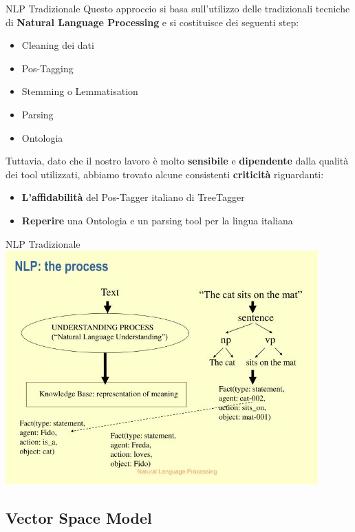 \documentclass[british]{beamer}
\begin{document}
\begin{frame}{NLP Tradizionale}
	Questo approccio si basa sull'utilizzo delle tradizionali tecniche di \textbf{Natural Language Processing} e si costituisce dei seguenti step:
	\begin{itemize}
		\item Cleaning dei dati
		\item Pos-Tagging
		\item Stemming o Lemmatisation
		\item Parsing
		\item Ontologia
	\end{itemize}
	Tuttavia, dato che il nostro lavoro \`{e} molto \textbf{sensibile} e \textbf{dipendente} dalla qualit\`{a} dei tool utilizzati, abbiamo trovato alcune consistenti \textbf{criticit\`{a}} riguardanti:
	\begin{itemize}
		\item \textbf{L'affidabilit\`{a}} del Pos-Tagger italiano di TreeTagger
		\item \textbf{Reperire} una Ontologia e un parsing tool per la  lingua italiana
	\end{itemize}
\end{frame}

\begin{frame}{NLP Tradizionale}
	\includegraphics[width=0.9\textwidth, height=0.85\textheight]{./Imgs/nlp-the-process.jpg}
\end{frame}
	
\subsection{Vector Space Model}
	
\end{document}
